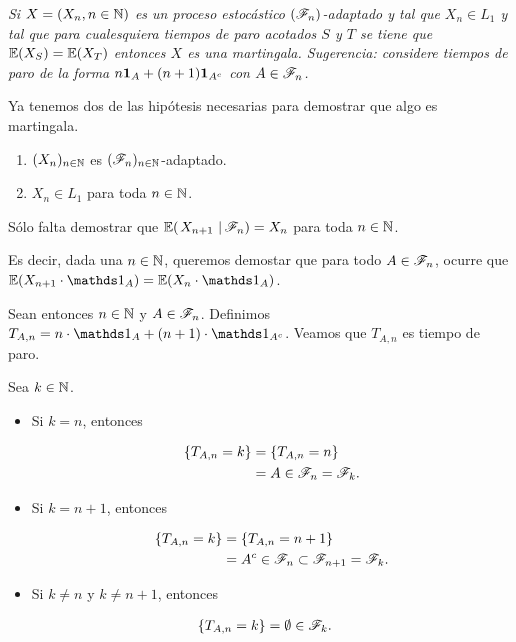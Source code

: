 \emph{
	Si $X=\left( X_n,n\in\mathbb{N}\right) $ es un proceso estoc\'astico $\left( \mathscr{F}_n\right) $-adaptado y tal que $X_n\in L_1$ y tal que 
	para cualesquiera tiempos de paro acotados $S$ y $T$ se tiene que $\mathbb{E}\! \left( X_S \right)=\mathbb{E}\! \left( X_T \right)$ entonces $X$ es una 
	martingala. Sugerencia: considere tiempos de paro de la forma $n{\bf{1}}_{A}+(n+1){\bf{1}}_{A^c}$ con $A\in\mathscr{F}_n$.
}

\afterstatement\pn

	Ya tenemos dos de las hipótesis necesarias para demostrar que algo es martingala.
    \begin{enumerate}
        \item 
            $(X_n)_{n\in\mathbb{N}}$ es $(\mathscr{F}_n)_{n \in \mathbb{N}}$-adaptado.

        \item 
            $X_n \in L_1$ para toda $n \in \mathbb{N}$. 
    \end{enumerate}\pn


	Sólo falta demostrar que $\espc{X_{n+1}}{\F_n} = X_n$ para toda $n \in \mathbb{N}$.\pn

    Es decir, dada una $n \in \mathbb{N}$, queremos demostar que para todo $A \in \mathscr{F}_n$,
    ocurre que $\E(X_{n+1} \cdot \indic_{A}) = \E(X_{n} \cdot \indic_{A})$.\pn

    Sean entonces $n \in \mathbb{N}$ y $A \in \mathscr{F}_n$. Definimos $T_{A,n} = n\cdot\indic_{A} + (n+1) \cdot \indic_{A^c}$. 
    Veamos que $T_{A, n}$ es tiempo de paro.\pn

	Sea $k \in \mathbb{N}$.

    \begin{itemize}
        \item 
            Si $k = n$, entonces 
            
            \begin{align}
                \{T_{A, n} = k\} 	&= \{T_{A, n} = n\} \\
                                    &= A \in \mathscr{F}_n = \mathscr{F}_k.
            \end{align}
            
        \item
            Si $k = n + 1$, entonces 
            
            \begin{align}
                \{T_{A, n} = k\} 	&= \{T_{A, n} = n + 1\} \\
                                    &= A^c \in \mathscr{F}_n \subset \mathscr{F}_{n+1} = \mathscr{F}_k.
            \end{align}

        \item 
            Si $k \not= n$ y $k \not= n+1$, entonces
            
            \begin{align}
                \{T_{A, n} = k\} 	&= \emptyset \in \mathscr{F}_k.
            \end{align}
    \end{itemize}\pn

